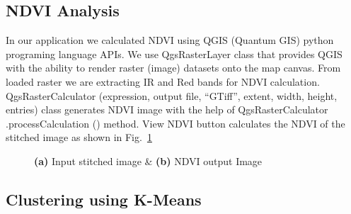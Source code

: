 \subsection{NDVI Analysis}

In our application we calculated NDVI using QGIS (Quantum GIS) python programing language APIs. We use QgsRasterLayer class that provides QGIS with the ability to render raster (image) datasets onto the map canvas. From loaded raster we are extracting IR and Red bands for NDVI calculation. QgsRasterCalculator (expression, output file, ``GTiff'', extent, width, height, entries) class generates NDVI image with the help of QgsRasterCalculator .processCalculation () method. View NDVI button calculates the NDVI of the stitched image as shown in Fig.~\ref{fig: stitching}

\begin{figure}[h]
	\hfill
	\hfill
	\hfill
	\caption{\label{fig: stitching}\textbf{(a)} Input stitched image \& \textbf{(b)} NDVI output Image}
\end{figure}

\subsection{Clustering using K-Means}

